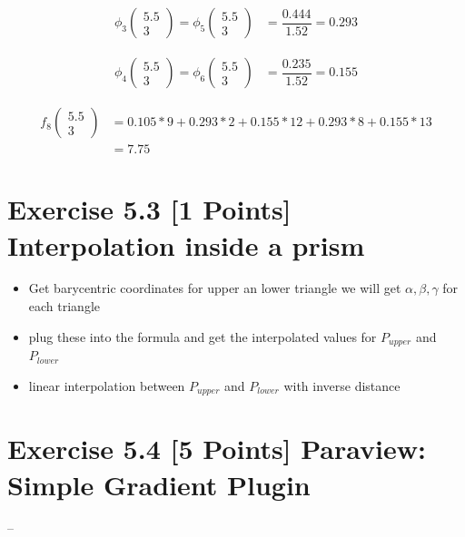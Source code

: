 \documentclass[a4paper]{article}
\begin{document}
\begin{align*}
\phi_{3}
\begin{pmatrix}
5.5 \\
3
\end{pmatrix}
=
\phi_{5}
\begin{pmatrix}
5.5 \\
3
\end{pmatrix}
& = \dfrac{0.444}{1.52} = 0.293
\end{align*}

\begin{align*}
\phi_{4}
\begin{pmatrix}
5.5 \\
3
\end{pmatrix}
=
\phi_{6}
\begin{pmatrix}
5.5 \\
3
\end{pmatrix}
& = \dfrac{0.235}{1.52} = 0.155
\end{align*}

\begin{align*}
f_{8}
\begin{pmatrix}
5.5 \\
3
\end{pmatrix}
& = 0.105 * 9 + 0.293 * 2 + 0.155 * 12 + 0.293 * 8 + 0.155 * 13\\
& = 7.75
\end{align*}

\section*{Exercise 5.3 [1 Points] Interpolation inside a prism}
\begin{itemize}
	\item Get barycentric coordinates for upper an lower triangle we will get $ \alpha, \beta, \gamma $ for each triangle
	\item plug these into the formula and get the interpolated values for $ P_{upper} $ and $ P_{lower} $
	\item linear interpolation between $ P_{upper} $ and $ P_{lower} $ with inverse distance
\end{itemize}

\section*{Exercise 5.4 [5 Points] Paraview: Simple Gradient Plugin}
--
	
\end{document}
